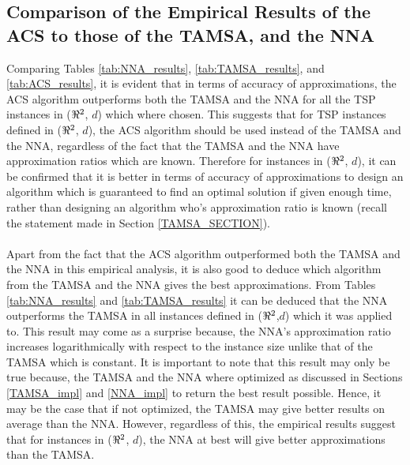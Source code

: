 \documentclass[12pt]{article}
\numberwithin{equation}{subsection}
\numberwithin{table}{subsection}
\numberwithin{algorithm}{subsection}
\numberwithin{figure}{subsection}
\begin{document}
\subsection{Comparison of the Empirical Results of the ACS to those of the TAMSA, and the NNA}
\label{comparison}
Comparing Tables \ref{tab:NNA_results}, \ref{tab:TAMSA_results}, and \ref{tab:ACS_results}, it is evident that in terms of accuracy of approximations, the ACS algorithm outperforms both the TAMSA and the NNA for all the TSP instances in ($\real^2$, $d$) which where chosen. This suggests that for TSP instances defined in ($\real^2$, $d$), the ACS algorithm should be used instead of the TAMSA and the NNA, regardless of the fact that the TAMSA and the NNA have approximation ratios which are known. Therefore for instances in ($\real^2$, $d$), it can be confirmed that it is better in terms of accuracy of approximations to design an algorithm which is guaranteed to find an optimal solution if given enough time, rather than designing an algorithm who's approximation ratio is known (recall the statement made in Section \ref{TAMSA_SECTION}).\\\\
Apart from the fact that the ACS algorithm outperformed both the TAMSA and the NNA in this empirical analysis, it is also good to deduce which algorithm from the TAMSA and the NNA gives the best approximations. From Tables \ref{tab:NNA_results} and \ref{tab:TAMSA_results} it can be deduced that the NNA outperforms the TAMSA in all instances defined in ($\real^2$,$d$) which it was applied to. This result may come as a surprise because, the NNA's approximation ratio increases logarithmically with respect to the instance size unlike that of the TAMSA which is constant. It is important to note that this result may only be true because, the TAMSA and the NNA where optimized as discussed in Sections \ref{TAMSA_impl} and \ref{NNA_impl} to return the best result possible. Hence, it may be the case that if not optimized, the TAMSA may give better results on average than the NNA. However, regardless of this, the empirical results suggest that for instances in ($\real^2$, $d$), the NNA at best will give better approximations than the TAMSA.
\newpage
\end{document}
